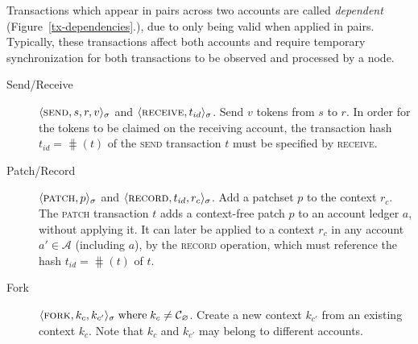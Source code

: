Transactions which appear in pairs across two accounts are called
\emph{dependent} (Figure~\ref{tx-dependencies}.), due to only being valid when
applied in pairs. Typically, these transactions affect both accounts and
require temporary synchronization for both transactions to be observed and
processed by a node.

\begin{figure*}[hbp]
    
    \caption{Three accounts, $A$, $B$ and $C$, and their transaction chains.
        The diagram illustrates free transactions, such as \textsc{open} and
        \textsc{patch}, as well as dependent transactions such as \textsc{send}
        and \textsc{receive}.  The dashed lines represent cross-chain
        synchronizations between dependent transactions.
    \label{tx-dependencies}}
\end{figure*}

\begin{description}
    \item[Send/Receive] $\langle \text{\normalfont\scshape send}, s, r, v \rangle_{\sigma}$ and
        $\langle \text{\normalfont\scshape receive}, t_{id} \rangle_{\sigma}$. Send $v$ tokens from $s$ to $r$. In
        order for the tokens to be claimed on the receiving account, the
        transaction hash $t_{id} = \hash(t)$ of the \textsc{send} transaction
        $t$ must be specified by \textsc{receive}.
    \item[Patch/Record] $\langle \text{\normalfont\scshape patch}, p \rangle_\sigma$ and $\langle \text{\normalfont\scshape record}, t_{id},
        r_c \rangle_{\sigma}$.  Add a patchset $p$ to the context $r_c$. The
        \textsc{patch} transaction $t$ adds a context-free patch $p$ to an
        account ledger $a$, without applying it. It can later be applied to a
        context $r_c$ in any account $a' \in \mathcal{A}$ (including $a$), by
        the \textsc{record} operation, which must reference the hash $t_{id} =
        \hash(t)$ of $t$.
    \item[Fork] $\langle \text{\normalfont\scshape fork}, k_c, k_{c'} \rangle_\sigma \; \text{where} \; k_c \neq
        \mathcal{C}_{\varnothing}$. Create a new context $k_{c'}$ from an
        existing context $k_c$. Note that $k_c$ and $k_{c'}$ may belong to
        different accounts.
\end{description}
